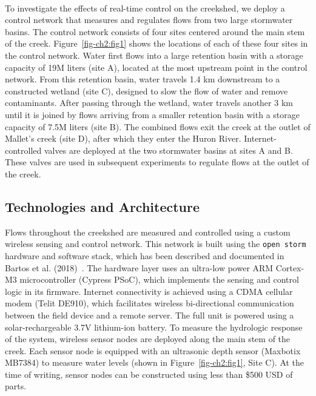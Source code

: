 \

To investigate the effects of real-time control on the creekshed, we deploy a control network that measures and regulates flows from two large stormwater basins. The control network consists of four sites centered around the main stem of the creek. Figure~\ref{fig-ch2:fig1} shows the locations of each of these four sites in the control network. Water first flows into a large retention basin with a storage capacity of 19M liters (site A), located at the most upstream point in the control network. From this retention basin, water travels 1.4 km downstream to a constructed wetland (site C), designed to slow the flow of water and remove contaminants. After passing through the wetland, water travels another 3 km until it is joined by flows arriving from a smaller retention basin with a storage capacity of 7.5M liters (site B). The combined flows exit the creek at the outlet of Mallet's creek (site D), after which they enter the Huron River. Internet-controlled valves are deployed at the two stormwater basins at sites A and B. These valves are used in subsequent experiments to regulate flows at the outlet of the creek.

\subsection{Technologies and Architecture}

Flows throughout the creekshed are measured and controlled using a custom wireless sensing and control network. This network is built using the \texttt{open storm} hardware and software stack, which has been described and documented in Bartos et al. (2018)~\cite{Bartos_2018}. The hardware layer uses an ultra-low power ARM Cortex-M3 microcontroller (Cypress PSoC), which implements the sensing and control logic in its firmware. Internet connectivity is achieved using a CDMA cellular modem (Telit DE910), which facilitates wireless bi-directional communication between the field device and a remote server. The full unit is powered using a solar-rechargeable 3.7V lithium-ion battery. To measure the hydrologic response of the system, wireless sensor nodes are deployed along the main stem of the creek. Each sensor node is equipped with an ultrasonic depth sensor (Maxbotix MB7384) to measure water levels (shown in Figure~\ref{fig-ch2:fig1}, Site C). At the time of writing, sensor nodes can be constructed using less than \$500 USD of parts. %

